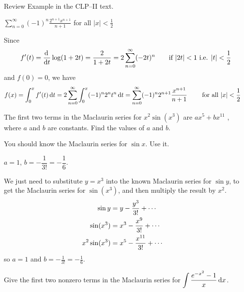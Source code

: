 \begin{hint}
Review Example  in the CLP--II text.
\end{hint}

\begin{answer}
$\displaystyle\sum_{n=0}^\infty  (-1)^n  \frac{2^{n+1} x^{n+1}}{n+1}$
for all $|x|<\frac{1}{2}$
\end{answer}

\begin{solution}
Since
\begin{equation*}
f'(t) =\diff{}{t}\log(1+2t) = \frac{2}{1+2t} = 2\sum_{n=0}^\infty(-2t)^n
\qquad\text{if }|2t|<1\text{ i.e. }|t|<\frac{1}{2}
\end{equation*}
and $f(0)=0$, we have
\begin{align*}
f(x)
&=\int_0^x f'(t) \,\mathrm{d}t
=2 \sum_{n=0}^\infty \int_0^x (-1)^n 2^n t^n\,\mathrm{d}t
=\sum_{n=0}^\infty  (-1)^n 2^{n+1} \frac{x^{n+1}}{n+1}
\qquad\text{ for all }|x|<\frac{1}{2}
\end{align*}
\end{solution}



\begin{question}[2013A]
The first two terms in the Maclaurin series for
$x^2 \sin(x^3)$ are $ax^5 + bx^{11}$ , where $a$ and
$b$ are constants. Find the values of $a$ and $b$.
\end{question}

\begin{hint}
You should know the Maclaurin series for $\sin x$. Use it.
\end{hint}

\begin{answer}
 $a=1$, $b=-\dfrac{1}{3!}=-\dfrac{1}{6}$.
\end{answer}

\begin{solution}
We just need to substitute $y=x^3$ into the known Maclaurin series for $\sin y$,
to get the Maclaurin series for $\sin(x^3)$, and then multiply the result
by $x^2$.
\begin{align*}
\sin y&= y-\frac{y^3}{3!}+\cdots \cr
\sin(x^3)&= x^3-\frac{x^9}{3!}+\cdots \cr
x^2\sin(x^3)&= x^5-\frac{x^{11}}{3!}+\cdots \cr
\end{align*}
so $a=1$ and $b=-\frac{1}{3!}=-\frac{1}{6}$.

\end{solution}


\begin{Mquestion}[2014D]
Give the first two nonzero terms in the Maclaurin series for $\displaystyle{\int \frac{e^{-x^2}-1}{x} \,\mathrm{d}x}$.
\end{Mquestion}

